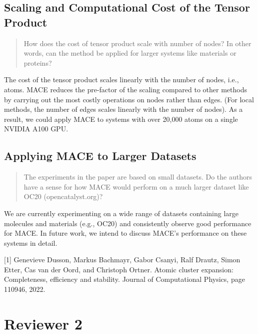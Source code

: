 \documentclass{article}
\begin{document}
\subsection*{Scaling and Computational Cost of the Tensor Product} 


\begin{quote}
How does the cost of tensor product scale with number of nodes? In other words, can the method be applied for larger systems like materials or proteins?
\end{quote}

The cost of the tensor product scales linearly with the number of nodes, i.e., atoms.
MACE reduces the pre-factor of the scaling compared to other methods by carrying out the most costly operations on nodes rather than edges. (For local methods, the number of edges scales linearly with the number of nodes).
As a result, we could apply MACE to systems with over 20,000 atoms on a single NVIDIA A100 GPU.

\subsection*{Applying MACE to Larger Datasets} 

\begin{quote}
The experiments in the paper are based on small datasets. Do the authors have a sense for how MACE would perform on a much larger dataset like OC20 (opencatalyst.org)?
\end{quote}

We are currently experimenting on a wide range of datasets containing large molecules and materials (e.g., OC20) and consistently observe good performance for MACE.
In future work, we intend to discuss MACE's performance on these systems in detail.

\par\medskip

[1] Genevieve Dusson, Markus Bachmayr, Gabor Csanyi, Ralf Drautz, Simon Etter, Cas van der Oord, and Christoph Ortner. Atomic cluster expansion: Completeness, efficiency and stability. Journal of Computational Physics, page 110946, 2022.

\section{Reviewer 2}
\end{document}
